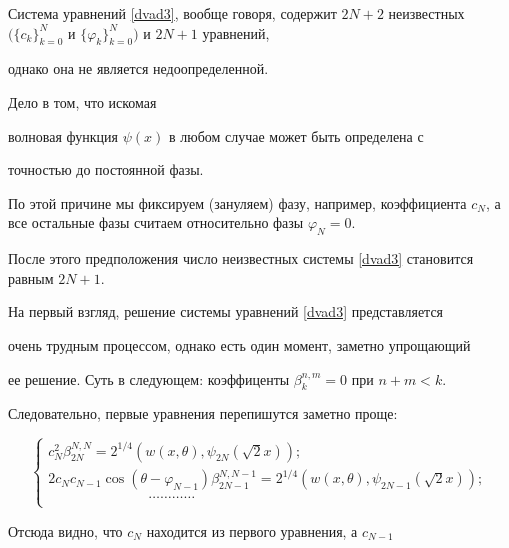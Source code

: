 Система уравнений \eqref{dvad3}, вообще говоря, содержит $2N+2$ неизвестных $\bigl(\{c_k\}_{k=0}^{N}$ и $\{\varphi_k\}_{k=0}^{N}\bigr)$ и $2N+1$ уравнений, 

 однако она не является недоопределенной. 

 Дело в том, что искомая 

 волновая функция $\psi(x)$ в любом случае может быть определена с

 точностью до постоянной фазы. 

 По этой причине мы фиксируем (зануляем)   фазу, например, коэффициента $c_N$, а все остальные фазы считаем  относительно фазы $\varphi_N=0$. 

 После этого предположения число  неизвестных системы \eqref{dvad3} становится равным $2N+1$.

 



 

На первый взгляд, решение системы уравнений \eqref{dvad3} представляется 

очень трудным процессом, однако есть один момент, заметно упрощающий 

ее решение. Суть в следующем: коэффиценты $\beta_k^{n,m}=0$ при $n+m <k$. 

Следовательно, первые уравнения перепишутся заметно проще:

\begin{equation} \label{dvad4}

          \left\{

           \begin{array}{l}

           c_N^2\beta_{2N}^{N,N}=

2^{1/4}\left(w(x,\theta),\psi_{2N} (\sqrt{2}x)\right);\\[3mm]

           2c_N c_{N-1} \cos\left(\theta-\varphi_{N-1}\right)\beta_{2N-1}^{N,N-1}=

2^{1/4}\left(w(x,\theta),\psi_{2N-1} (\sqrt{2}x)\right);\\

\hspace{3cm}\ldots\ldots\ldots\ldots \\

           \end{array}

\right.

  \end{equation}

Отсюда видно, что $c_N$ находится из первого уравнения, а $c_{N-1}$ 

